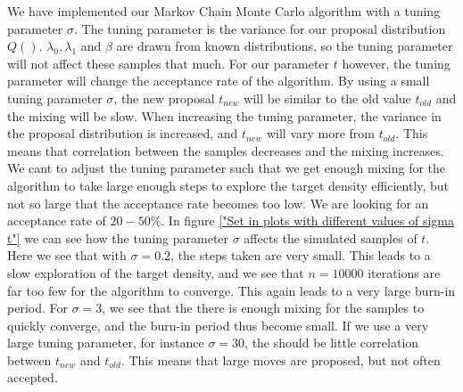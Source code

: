 We have implemented our Markov Chain Monte Carlo algorithm with a tuning parameter $\sigma$. The tuning parameter is the variance for our proposal distribution $Q()$. $\lambda_0, \lambda_1$ and $\beta$ are drawn from known distributions, so the tuning parameter will not affect these samples that much. For our parameter $t$ however, the tuning parameter will change the acceptance rate of the algorithm. By using a small tuning parameter $\sigma$, the new proposal $t_{new}$ will be similar to the old value $t_{old}$ and the mixing will be slow. When increasing the tuning parameter, the variance in the proposal distribution is increased, and $t_{new}$ will vary more from $t_{old}$. This means that correlation between the samples decreases and the mixing increases. We cant to adjust the tuning parameter such that we get enough mixing for the algorithm to take large enough steps to explore the target density efficiently, but not so large that the acceptance rate becomes too low. We are looking for an acceptance rate of $20 - 50\%$. In figure \ref{"Set in plots with different values of sigma t"} we can see how the tuning parameter $\sigma$ affects the simulated samples of $t$.  Here we see that with $\sigma = 0.2$, the steps taken are very small. This leads to a slow exploration of the target density, and we see that $n = 10000$ iterations are far too few for the algorithm to converge. This again leads to a very large burn-in period. For $\sigma = 3$, we see that the there is enough mixing for the samples to quickly converge, and the burn-in period thus become small. If we use a very large tuning parameter, for instance $\sigma = 30$, the should be little correlation between $t_{new}$ and $t_{old}$. This means that large moves are proposed, but not often accepted. 


